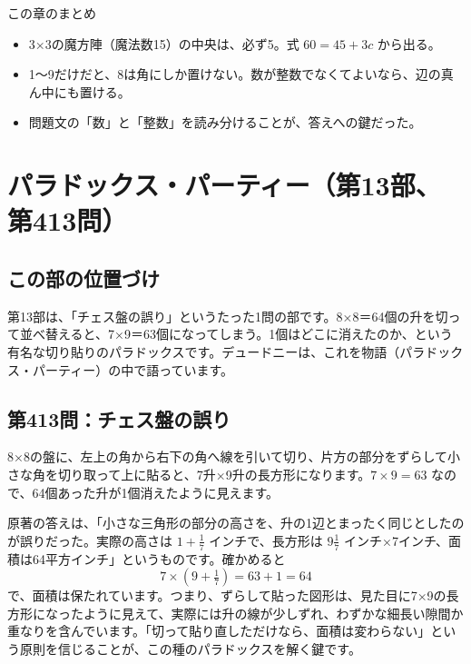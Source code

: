 \documentclass[a4paper,11pt,openany]{ltjsbook}
\begin{document}
\begin{pointbox}{この章のまとめ}
\begin{itemize}[leftmargin=*]
\item 3×3の魔方陣（魔法数15）の中央は、必ず5。式 $60=45+3c$ から出る。
\item 1〜9だけだと、8は角にしか置けない。数が整数でなくてよいなら、辺の真ん中にも置ける。
\item 問題文の「数」と「整数」を読み分けることが、答えへの鍵だった。
\end{itemize}
\end{pointbox}

\chapter{パラドックス・パーティー（第13部、第413問）}

\section{この部の位置づけ}

第13部は、「チェス盤の誤り」というたった1問の部です。8×8＝64個の升を切って並べ替えると、7×9＝63個になってしまう。1個はどこに消えたのか、という有名な切り貼りのパラドックスです。デュードニーは、これを物語（パラドックス・パーティー）の中で語っています。

\section{第413問：チェス盤の誤り}

8×8の盤に、左上の角から右下の角へ線を引いて切り、片方の部分をずらして小さな角を切り取って上に貼ると、7升×9升の長方形になります。$7\times9=63$ なので、64個あった升が1個消えたように見えます。

原著の答えは、「小さな三角形の部分の高さを、升の1辺とまったく同じとしたのが誤りだった。実際の高さは $1+\tfrac17$ インチで、長方形は $9\tfrac17$ インチ×7インチ、面積は64平方インチ」というものです。確かめると
\[
7\times\left(9+\tfrac17\right)=63+1=64
\]
で、面積は保たれています。つまり、ずらして貼った図形は、見た目に7×9の長方形になったように見えて、実際には升の線が少しずれ、わずかな細長い隙間か重なりを含んでいます。「切って貼り直しただけなら、面積は変わらない」という原則を信じることが、この種のパラドックスを解く鍵です。
\end{document}
